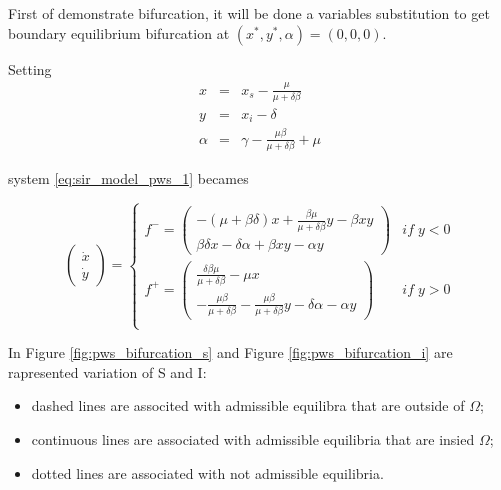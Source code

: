 First of demonstrate bifurcation, it will be done a variables substitution to get boundary equilibrium bifurcation at $(x^*,y^*,\alpha) = (0,0,0)$.

Setting
\begin{equation}
    \begin{array}{ccc}
        x &=& x_s - \frac{\mu}{\mu+\delta\beta} \\
        y &=& x_i - \delta \\
        \alpha &=& \gamma - \frac{\mu\beta}{\mu+\delta\beta}+\mu
    \end{array}
\end{equation}

system \ref{eq:sir_model_pws_1} becames

\begin{equation}
    \label{eq:sir_model_pws_2}
    \begin{pmatrix} \dot{x} \\ \dot{y} \end{pmatrix} =
    \begin{cases}
        f^- =
        \begin{pmatrix} -(\mu+\beta\delta)x+\frac{\beta\mu}{\mu+\delta\beta}y-\beta xy \\
        \beta\delta x-\delta\alpha+\beta xy -\alpha y
        \end{pmatrix}
        & if\;y < 0 \\
        f^+ =
        \begin{pmatrix}
        \frac{\delta\beta\mu}{\mu+\delta\beta} -\mu x \\
        -\frac{\mu\beta}{\mu+\delta\beta}-\frac{\mu\beta}{\mu+\delta\beta}y-\delta\alpha-\alpha y
        \end{pmatrix}
        & if\;y > 0 \\
    \end{cases}
\end{equation}



In Figure \ref{fig:pws_bifurcation_s} and Figure \ref{fig:pws_bifurcation_i} are rapresented variation of S and I:
\begin{itemize}
    \item dashed lines are associted with admissible equilibra that are outside of $\Omega$;
    \item continuous lines are associated with admissible equilibria that are insied $\Omega$;
    \item dotted lines are associated with not admissible equilibria.
\end{itemize}

